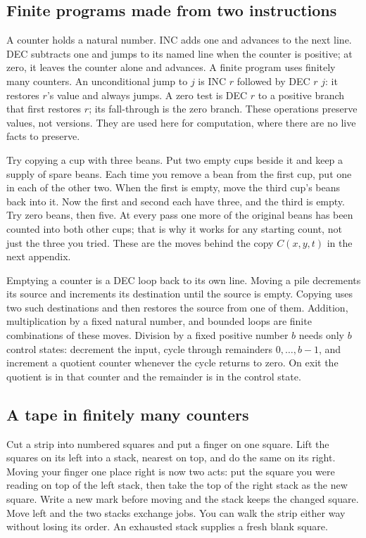 \documentclass[11pt,twoside]{article}
\theoremstyle{thielethm}
\theoremstyle{thieledef}
\theoremstyle{thieledef}
\theoremstyle{thieledef}
\theoremstyle{thielethm}
\theoremstyle{thieleobs}
\theoremstyle{thielethm}
\begin{document}
\subsection{Finite programs made from two instructions}

A counter holds a natural number. INC adds one and advances to the next line.
DEC subtracts one and jumps to its named line when the counter is positive; at zero,
it leaves the counter alone and advances. A finite program uses finitely many counters.
An unconditional jump to $j$ is INC $r$ followed by DEC $r$ $j$: it restores $r$'s
value and always jumps. A zero test is DEC $r$ to a positive branch that first restores
$r$; its fall-through is the zero branch. These operations preserve values, not versions.
They are used here for computation, where there are no live facts to preserve.

Try copying a cup with three beans. Put two empty cups beside it and keep a supply
of spare beans. Each time you remove a bean from the first cup, put one in each of
the other two. When the first is empty, move the third cup's beans back into it.
Now the first and second each have three, and the third is empty. Try zero beans,
then five. At every pass one more of the original beans has been counted into
both other cups; that is why it works for any starting count, not just the three
you tried. These are the moves behind the copy $C(x,y,t)$ in the next appendix.

Emptying a counter is a DEC loop back to its own line. Moving a pile decrements
its source and increments its destination until the source is empty. Copying
uses two such destinations and then restores the source from one of them.
Addition, multiplication by a fixed natural number, and bounded loops are finite
combinations of these moves. Division by a fixed positive number $b$ needs only
$b$ control states: decrement the input, cycle through remainders $0,\ldots,b-1$,
and increment a quotient counter whenever the cycle returns to zero. On exit the
quotient is in that counter and the remainder is in the control state.

\subsection{A tape in finitely many counters}

Cut a strip into numbered squares and put a finger on one square. Lift the squares
on its left into a stack, nearest on top, and do the same on its right. Moving your
finger one place right is now two acts: put the square you were reading on top of
the left stack, then take the top of the right stack as the new square. Write a
new mark before moving and the stack keeps the changed square. Move left and the
two stacks exchange jobs. You can walk the strip either way without losing its
order. An exhausted stack supplies a fresh blank square.
\end{document}
